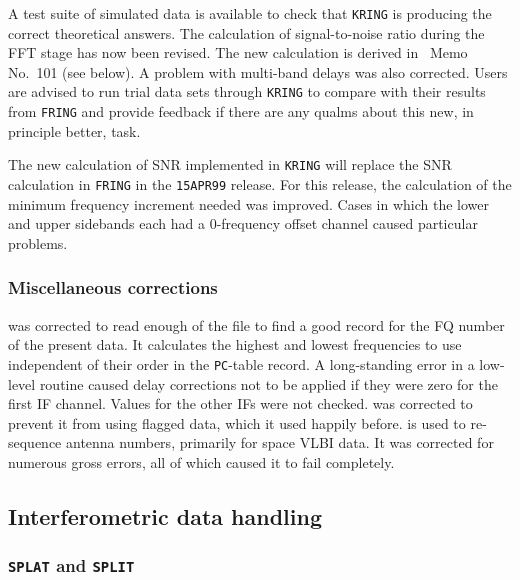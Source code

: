 A test suite of simulated data is available to check that {\tt KRING}
is producing the correct theoretical answers.  The calculation of
signal-to-noise ratio during the FFT stage has now been revised.  The
new calculation is derived in \AIPS\ Memo No.~101 (see below).  A
problem with multi-band delays was also corrected.  Users are advised
to run trial data sets through {\tt KRING} to compare with their
results from {\tt FRING} and provide feedback if there are any qualms
about this new, in principle better, task.

The new calculation of SNR implemented in {\tt KRING} will replace the
SNR calculation in {\tt FRING} in the {\tt 15APR99} release.  For this
release, the calculation of the minimum frequency increment needed was
improved.  Cases in which the lower and upper sidebands each had a
0-frequency offset channel caused particular problems.

\subsubsection{Miscellaneous corrections}

\begin{description}
 was corrected to read enough of the file to find a good
   record for the FQ number of the present data.  It calculates the
   highest and lowest frequencies to use independent of their order in
   the {\tt PC}-table record.
 \hspace{38pt} A long-standing error in a
   low-level routine caused delay corrections not to be applied if
   they were zero for the first IF channel.  Values for the other IFs
   were not checked.
 was corrected to prevent it from using flagged data,
   which it used happily before.
 is used to re-sequence antenna numbers, primarily for
   space VLBI data.  It was corrected for numerous gross errors, all
   of which caused it to fail completely.
\end{description}

\subsection{Interferometric data handling}

\subsubsection{{\tt SPLAT} and {\tt SPLIT}}

